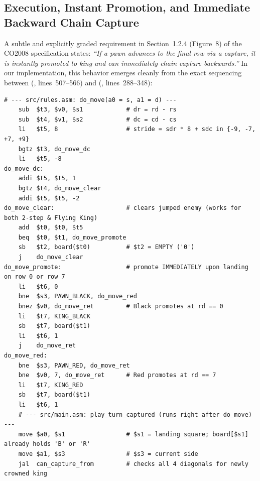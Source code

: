 \subsection{Execution, Instant Promotion, and Immediate Backward Chain Capture}
\label{sec:promotion_chain}
A subtle and explicitly graded requirement in Section~1.2.4 (Figure~8) of the CO2008 specification states: \emph{``If a pawn advances to the final row via a capture, it is instantly promoted to king and can immediately chain capture backwards.''} In our implementation, this behavior emerges cleanly from the exact sequencing between  (, lines~507--566) and  (, lines~288--348):

\begin{lstlisting}[style=mipsstyle, caption={Unified intermediate-square clearing, instant promotion (\code{src/rules.asm}:528--560), and post-promotion chain check (\code{src/main.asm}:295--298).}, label={lst:domove_chain}]
    # --- src/rules.asm: do_move(a0 = s, a1 = d) ---
    sub  $t3, $v0, $s1            # dr = rd - rs
    sub  $t4, $v1, $s2            # dc = cd - cs
    li   $t5, 8                   # stride = sdr * 8 + sdc in {-9, -7, +7, +9}
    bgtz $t3, do_move_dc
    li   $t5, -8
do_move_dc:
    addi $t5, $t5, 1
    bgtz $t4, do_move_clear
    addi $t5, $t5, -2
do_move_clear:                    # clears jumped enemy (works for both 2-step & Flying King)
    add  $t0, $t0, $t5
    beq  $t0, $t1, do_move_promote
    sb   $t2, board($t0)          # $t2 = EMPTY ('0')
    j    do_move_clear
do_move_promote:                  # promote IMMEDIATELY upon landing on row 0 or row 7
    li   $t6, 0
    bne  $s3, PAWN_BLACK, do_move_red
    bnez $v0, do_move_ret         # Black promotes at rd == 0
    li   $t7, KING_BLACK
    sb   $t7, board($t1)
    li   $t6, 1
    j    do_move_ret
do_move_red:
    bne  $s3, PAWN_RED, do_move_ret
    bne  $v0, 7, do_move_ret      # Red promotes at rd == 7
    li   $t7, KING_RED
    sb   $t7, board($t1)
    li   $t6, 1
    # --- src/main.asm: play_turn_captured (runs right after do_move) ---
    move $a0, $s1                 # $s1 = landing square; board[$s1] already holds 'B' or 'R'
    move $a1, $s3                 # $s3 = current side
    jal  can_capture_from         # checks all 4 diagonals for newly crowned king
\end{lstlisting}

